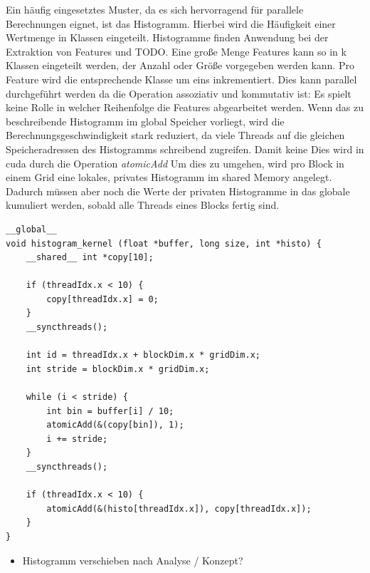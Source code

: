 Ein häufig eingesetztes Muster, da es sich hervorragend für parallele Berechnungen eignet, ist das Histogramm. Hierbei wird die Häufigkeit einer Wertmenge in Klassen eingeteilt. Histogramme finden Anwendung bei der Extraktion von Features und TODO. Eine große Menge Features kann so in k Klassen eingeteilt werden, der Anzahl oder Größe vorgegeben werden kann. Pro Feature wird die entsprechende Klasse um eins inkrementiert. Dies kann parallel durchgeführt werden da die Operation assoziativ und kommutativ ist: Es spielt keine Rolle in welcher Reihenfolge die Features abgearbeitet werden. Wenn das zu beschreibende Histogramm im global Speicher vorliegt, wird die Berechnungsgeschwindigkeit stark reduziert, da viele Threads auf die gleichen Speicheradressen des Histogramms schreibend zugreifen. Damit keine Dies wird in cuda durch die Operation \textit{atomicAdd} Um dies zu umgehen, wird pro Block in einem Grid eine lokales, privates Histogramm im shared Memory angelegt. Dadurch müssen aber noch die Werte der privaten Histogramme in das globale kumuliert werden, sobald alle Threads eines Blocks fertig sind.

\lstset{language=C}
\begin{lstlisting}
__global__
void histogram_kernel (float *buffer, long size, int *histo) {
	__shared__ int *copy[10];
	
	if (threadIdx.x < 10) {
		copy[threadIdx.x] = 0;		
	}
	__syncthreads();

	int id = threadIdx.x + blockDim.x * gridDim.x;
	int stride = blockDim.x * gridDim.x;
	
	while (i < stride) {
		int bin = buffer[i] / 10; 
		atomicAdd(&(copy[bin]), 1);
		i += stride;	
	}
	__syncthreads();
	
	if (threadIdx.x < 10) {
		atomicAdd(&(histo[threadIdx.x]), copy[threadIdx.x]);		
	}
}
\end{lstlisting} 

\begin{itemize}
	\item Histogramm verschieben nach Analyse / Konzept?
\end{itemize}